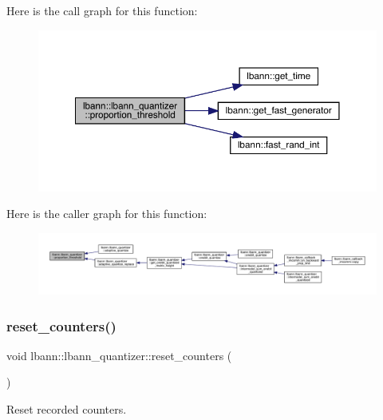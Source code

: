 Here is the call graph for this function\+:\nopagebreak
\begin{figure}[H]
\begin{center}
\leavevmode
\includegraphics[width=350pt]{classlbann_1_1lbann__quantizer_aa5aabc1cb4163e95aee993d9b37b9b32_cgraph}
\end{center}
\end{figure}
Here is the caller graph for this function\+:\nopagebreak
\begin{figure}[H]
\begin{center}
\leavevmode
\includegraphics[width=350pt]{classlbann_1_1lbann__quantizer_aa5aabc1cb4163e95aee993d9b37b9b32_icgraph}
\end{center}
\end{figure}
\mbox{\label{classlbann_1_1lbann__quantizer_aee1ea46e3191ad25fd310938eaf5a2e0}} 
\subsubsection{\texorpdfstring{reset\+\_\+counters()}{reset\_counters()}}
{\footnotesize\ttfamily void lbann\+::lbann\+\_\+quantizer\+::reset\+\_\+counters (\begin{DoxyParamCaption}{ }\end{DoxyParamCaption})\hspace{0.3cm}{\ttfamily [inline]}}

Reset recorded counters. 

